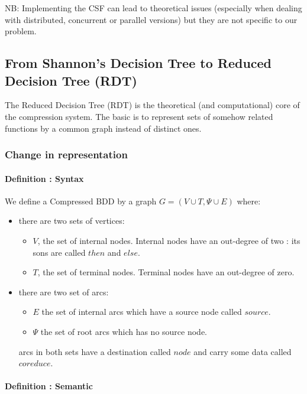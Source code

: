 \documentclass[a4paper,10pt]{article}
\begin{document}
NB: Implementing the CSF can lead to theoretical issues (especially when dealing with distributed, concurrent or parallel versions) but they are not specific to our problem.

\subsection{From Shannon's Decision Tree to Reduced Decision Tree (RDT)}
The Reduced Decision Tree (RDT) is the theoretical (and computational) core of the compression system.
The basic is to represent sets of somehow related functions by a common graph instead of distinct ones.

\subsubsection{Change in representation}

\paragraph*{Definition : Syntax\\}

We define a Compressed BDD by a graph $G = (V\cup T, \Psi\cup E)$ where:\begin{itemize}
  \item there are two sets of vertices:\begin{itemize}
    \item $V$, the set of internal nodes. Internal nodes have an out-degree of two : its sons are called $then$ and $else$.
    \item $T$, the set of terminal nodes. Terminal nodes have an out-degree of zero.
  \end{itemize}
  \item there are two set of arcs:\begin{itemize}
      \item $E$ the set of internal arcs which have a source node called $source$.
    \item $\Psi$ the set of root arcs which has no source node.
  \end{itemize} arcs in both sets have a destination called $node$ and carry some data called $coreduce$.
\end{itemize}

\paragraph*{Definition : Semantic\\}
\end{document}
